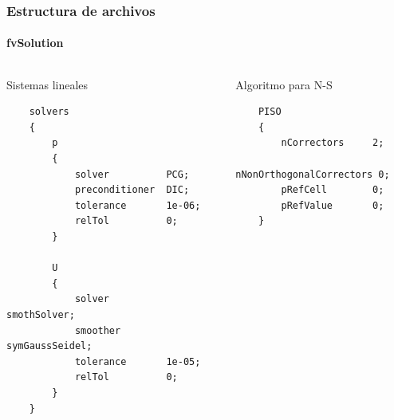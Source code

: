 \begin{frame}[fragile]
    \frametitle{Estructura de archivos}
    \framesubtitle{fvSolution}

\vspace{-0.8cm}
    \begin{columns}
        
            
            \begin{block}{\centering Sistemas lineales}
        
            \tiny
            \begin{verbatim}
    solvers
    {
        p
        {
            solver          PCG;
            preconditioner  DIC;
            tolerance       1e-06;
            relTol          0;
        }

        U
        {
            solver          smothSolver;
            smoother        symGaussSeidel;
            tolerance       1e-05;
            relTol          0;
        }
    }      
            \end{verbatim}                
            \end{block}

                
        
            \begin{block}{\centering Algoritmo para N-S}

        \tiny
        \begin{verbatim}
    PISO
    {
        nCorrectors     2;
        nNonOrthogonalCorrectors 0;
        pRefCell        0;
        pRefValue       0;
    }                 
        \end{verbatim}
                
            \end{block}        

        
    \end{columns}
    


\end{frame} 






